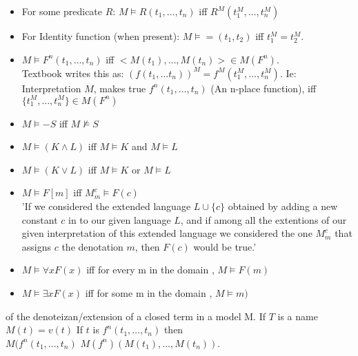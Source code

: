 \begin{definition}[Truth]
\begin{itemize}
\item For some predicate $R$: $M \vDash R(t_1,\dots,t_n)$ iff $R^M(t_1^M,\dots,t_n^M)$ \\
\item For Identity function (when present): $M \vDash =(t_1,t_2)$ iff $t_1^M = t_2^M$.
\item $M \vDash F^n (t_1,\dots,t_n)$ iff $<M(t_1),\dots,M(t_n)> \in M(F^n)$. \\
Textbook writes this as: $(f(t_1, \dots t_n))^M = f^M (t_1^M , \dots, t_n^M)$.
Ie: Interpretation $M$, makes true $f^n(t_1,\dots,t_n)$ (An n-place function), iff $\{t_1^M , \dots, t_n^M\} \in M(F^n)$ %
\item $M \vDash -S $ iff $M \not \vDash S$ %
\item $M \vDash (K \wedge L )$ iff $M \vDash K$ and $M \vDash L$ 
\item $M \vDash (K \vee L )$ iff $M \vDash K$ or $M \vDash L$ %
\item $M \vDash F[m]$ iff $M^c_m \vDash F(c)$ \\
'If we considered the extended language $L \cup \{c\}$ obtained by adding a new constant $c$ in to our given language $L$, and if among all the extentions of our given interpretation of this extended language we considered the one $M^c_m$ that assigns $c$ the denotation $m$, then $F(c)$ would be true.'

\item $M \vDash \forall x F (x) $ iff for every m in the domain , $M \vDash F(m)$
\item $M \vDash \exists x F (x) $ iff for some m in the domain , $M \vDash m)$

\end{itemize}
\end{definition}

\begin{definition}
of the denoteizan/extension of a closed term in a model M.
If $T$ is a name $M(t) = v(t)$
If $t$ is $f^n(t_1,\dots,t_n)$
then \\
$M(f^n(t_1,\dots,t_n)$
$M(f^n)(M(t_1),\dots,M(t_n)).$
\end{definition}

